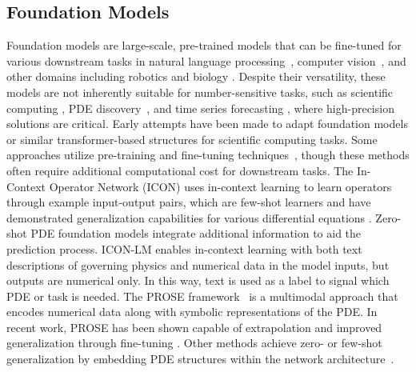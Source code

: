 \documentclass{article}
\begin{document}
\subsection{Foundation Models}
Foundation models are large-scale, pre-trained models that can be fine-tuned for various downstream tasks in natural language processing~\cite{brown2020language,touvron2023llama}, computer vision~\cite{ramesh2021zero}, and other domains including robotics and biology \cite{firoozi2023foundation, zhang2024scientific}. Despite their versatility, these models are not inherently suitable for number-sensitive tasks, such as scientific computing \cite{wang2024recent}, PDE discovery~\cite{schaeffer2017learning}, and time series forecasting \cite{tan2024language}, where high-precision solutions are critical.
Early attempts have been made to adapt foundation models or similar transformer-based structures for scientific computing tasks. Some approaches utilize pre-training and fine-tuning techniques~\cite{chen2024data,herde2024poseidon}, though these methods often require additional computational cost for downstream tasks.
The In-Context Operator Network (ICON) \cite{yang2023context, yang2023fine, yang2024pde,cao2024vicon} uses in-context learning to learn operators through example input-output pairs, which are few-shot learners and have demonstrated generalization capabilities for various differential equations \cite{yang2024pde}. Zero-shot PDE foundation models integrate additional information to aid the prediction process. ICON-LM \cite{yang2023fine} enables in-context learning with both text descriptions of governing physics and numerical data in the model inputs, but outputs are numerical only. In this way, text is used as a label to signal which PDE or task is needed. The PROSE framework~\cite{liu2024prose,sun2024towards,liu2024prosefd,jollie2024time} is a multimodal approach that encodes numerical data along with symbolic representations of the PDE. In recent work, PROSE has been shown capable of extrapolation \cite{sun2024towards} and improved generalization through fine-tuning \cite{sun2024lemon}.
Other methods achieve zero- or few-shot generalization by embedding PDE structures within the network architecture~\cite{lorsung2024physics,ye2024pdeformer}.
\end{document}
